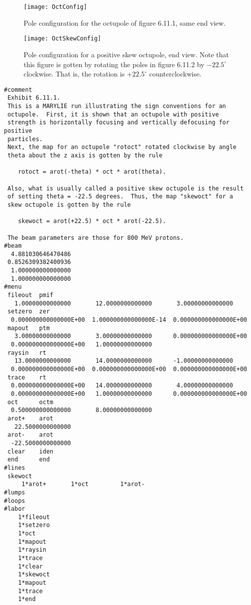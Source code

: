 \begin{figure}[p]
  \centering
  \texttt{[image: OctConfig]}
  \caption{Pole configuration for the octupole of figure 6.11.1, same end view.}
\end{figure}


\begin{figure}[p]
  \centering
  \texttt{[image: OctSkewConfig]}
  \caption{Pole configuration for a positive skew octupole, end view.  Note
that this figure is gotten by rotating the poles in figure 6.11.2 by $-22.5^{\circ}$ clockwise.  That is, the rotation is $+22.5^{\circ}$ counterclockwise.}
\end{figure}

\clearpage
\begin{footnotesize}
\begin{verbatim}
#comment
 Exhibit 6.11.1.
 This is a MARYLIE run illustrating the sign conventions for an
 octupole.  First, it is shown that an octupole with positive
 strength is horizontally focusing and vertically defocusing for positive
 particles.
 Next, the map for an octupole "rotoct" rotated clockwise by angle
 theta about the z axis is gotten by the rule

    rotoct = arot(-theta) * oct * arot(theta).

 Also, what is usually called a positive skew octupole is the result
 of setting theta = -22.5 degrees.  Thus, the map "skewoct" for a
 skew octupole is gotten by the rule

    skewoct = arot(+22.5) * oct * arot(-22.5).

 The beam parameters are those for 800 MeV protons.
#beam
  4.881030646470486
 0.8526309382400936
  1.000000000000000
  1.000000000000000
#menu
 fileout  pmif
   1.00000000000000       12.0000000000000       3.00000000000000
 setzero  zer
  0.000000000000000E+00  1.000000000000000E-14  0.000000000000000E+00
 mapout   ptm
   3.00000000000000       3.00000000000000      0.000000000000000E+00
  0.000000000000000E+00   1.00000000000000
 raysin   rt
   13.0000000000000       14.0000000000000      -1.00000000000000
  0.000000000000000E+00  0.000000000000000E+00  0.000000000000000E+00
 trace    rt
  0.000000000000000E+00   14.0000000000000       4.00000000000000
  0.000000000000000E+00   1.00000000000000      0.000000000000000E+00
 oct      octm
  0.500000000000000       8.00000000000000
 arot+    arot
   22.5000000000000
 arot-    arot
  -22.5000000000000
 clear    iden
 end      end
#lines
 skewoct
     1*arot+       1*oct         1*arot-
#lumps
#loops
#labor
    1*fileout
    1*setzero
    1*oct
    1*mapout
    1*raysin
    1*trace
    1*clear
    1*skewoct
    1*mapout
    1*trace
    1*end


\end{verbatim}
\end{footnotesize}
